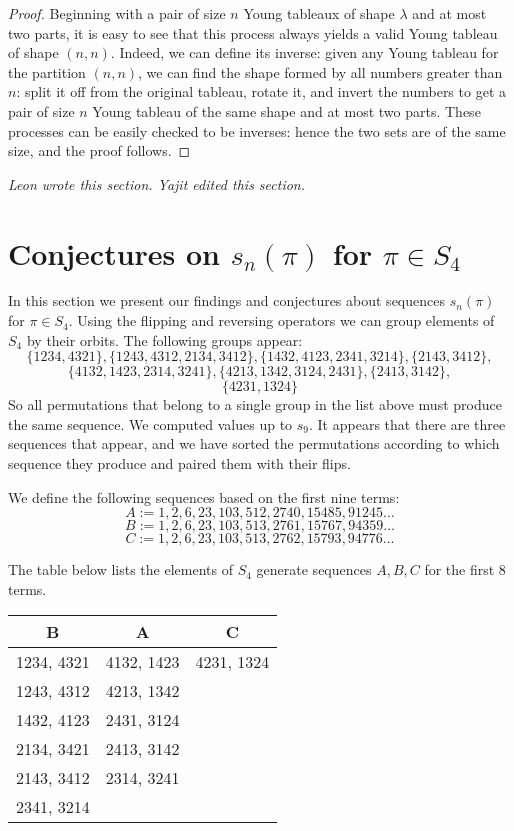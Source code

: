 \documentclass[11pt,letterpaper,twoside,english]{article}
\theoremstyle{theorem}
\theoremstyle{remark}
\begin{document}
\begin{proof}
Beginning with a pair of size $n$ Young tableaux of shape $\lambda$ and at most two parts, it is easy to see that this process always yields a valid Young tableau of shape $(n, n)$. Indeed, we can define its inverse: given any Young tableau for the partition $(n, n)$, we can find the shape formed by all numbers greater than $n$: split it off from the original tableau, rotate it, and invert the numbers to get a pair of size $n$ Young tableau of the same shape and at most two parts. These processes can be easily checked to be inverses: hence the two sets are of the same size, and the proof follows.
\end{proof}

\emph{Leon wrote this section. Yajit edited this section.}

\section{Conjectures on $s_n(\pi)$ for $\pi\in S_4$}
\label{S4}


In this section we present our findings and conjectures about sequences $s_n(\pi)$ for $\pi\in S_4$. Using the flipping and reversing operators we can group elements of $S_4$ by their orbits. The following groups appear: 
$$
\{1234,4321\},
\{1243,4312,2134,3412\},
\{1432,4123,2341,3214\},
\{2143,3412\},
$$
$$
\{4132,1423,2314,3241\},
\{4213,1342,3124,2431\},
\{2413,3142\},
$$
$$
\{4231,1324\}
$$
So all permutations that belong to a single group in the list above must produce the same sequence. 
We computed values up to $s_{9}$. It appears that there are three sequences that appear, and we have sorted the permutations according to which sequence they produce and paired them with their flips.  



We define the following sequences based on the first nine terms:
$$
A:=1,2,6,23,103,512,2740,15485,91245\ldots
$$
$$
B:=1,2,6,23,103,513,2761,15767,94359\ldots
$$
$$
C:=1,2,6,23,103,513,2762,15793,94776\ldots
$$

The table below lists the elements of $S_4$ generate sequences $A,B,C$ for the first 8 terms.

\begin{center}
\begin{tabular}{|c|c|c|}
B &A&C\\
\hline
1234, 4321&4132, 1423&4231, 1324\\
1243, 4312&4213, 1342&\\
1432, 4123&2431, 3124&\\
2134, 3421&2413, 3142&\\
2143, 3412&2314, 3241&\\
2341, 3214&&\\
\end{tabular}
\end{center}
\end{document}
